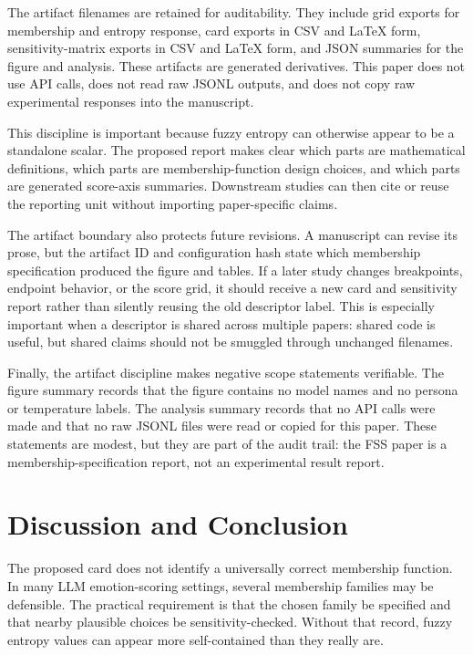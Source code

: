 \documentclass[a4paper,10pt,twocolumn]{myjarticle2}
\begin{document}
The artifact filenames are retained for auditability. They include grid
exports for membership and entropy response, card exports in CSV and LaTeX
form, sensitivity-matrix exports in CSV and LaTeX form, and JSON summaries for
the figure and analysis. These artifacts are generated derivatives. This paper
does not use API calls, does not read raw JSONL outputs, and does not copy raw
experimental responses into the manuscript.

This discipline is important because fuzzy entropy can otherwise appear to be
a standalone scalar. The proposed report makes clear which parts are
mathematical definitions, which parts are membership-function design choices,
and which parts are generated score-axis summaries. Downstream studies can
then cite or reuse the reporting unit without importing paper-specific claims.

The artifact boundary also protects future revisions. A manuscript can revise
its prose, but the artifact ID and configuration hash state which membership
specification produced the figure and tables. If a later study changes
breakpoints, endpoint behavior, or the score grid, it should receive a new
card and sensitivity report rather than silently reusing the old descriptor
label. This is especially important when a descriptor is shared across multiple
papers: shared code is useful, but shared claims should not be smuggled through
unchanged filenames.

Finally, the artifact discipline makes negative scope statements verifiable.
The figure summary records that the figure contains no model names and no
persona or temperature labels. The analysis summary records that no API calls
were made and that no raw JSONL files were read or copied for this paper. These
statements are modest, but they are part of the audit trail: the FSS paper is a
membership-specification report, not an experimental result report.

\section{Discussion and Conclusion}

The proposed card does not identify a universally correct membership function.
In many LLM emotion-scoring settings, several membership families may be
defensible. The practical requirement is that the chosen family be specified
and that nearby plausible choices be sensitivity-checked. Without that record,
fuzzy entropy values can appear more self-contained than they really are.
\end{document}
